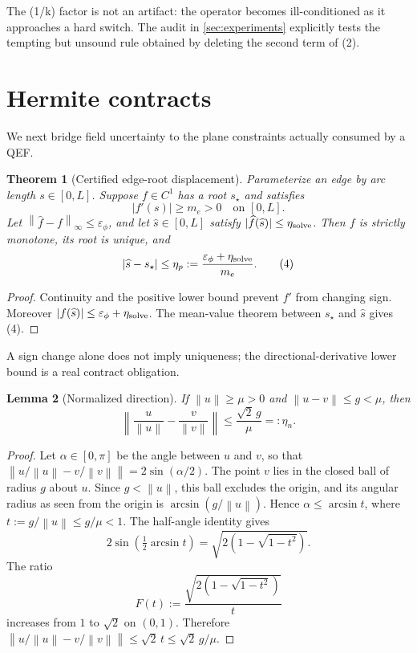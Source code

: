 \documentclass[11pt]{article}
\newtheorem{theorem}{Theorem}
\newtheorem{lemma}[theorem]{Lemma}
\theoremstyle{definition}
\newcommand{\norm}[1]{\left\lVert#1\right\rVert}
\begin{document}
The (1/k) factor is not an artifact: the operator becomes ill-conditioned as
it approaches a hard switch.  The audit in \cref{sec:experiments} explicitly
tests the tempting but unsound rule obtained by deleting the second term of
(2).

\section{Hermite contracts}

We next bridge field uncertainty to the plane constraints actually consumed by
a QEF.

\begin{theorem}[Certified edge-root displacement]
\label{thm:root}
Parameterize an edge by arc length \(s\in[0,L]\).  Suppose \(f\in C^1\) has a
root \(s_\star\) and satisfies
\[
|f'(s)|\ge m_e>0 \quad\text{on }[0,L].
\]
Let \(\norm{\widehat f-f}_\infty\le\varepsilon_\phi\), and let
\(\widehat s\in[0,L]\) satisfy
\(
|\widehat f(\widehat s)|\le\eta_{\rm solve}
\).  Then \(f\) is strictly monotone, its root is unique, and
\[
|\widehat s-s_\star|
\le\eta_p:=\frac{\varepsilon_\phi+\eta_{\rm solve}}{m_e}. \tag{4}
\]
\end{theorem}

\begin{proof}
Continuity and the positive lower bound prevent \(f'\) from changing sign.
Moreover
\(
|f(\widehat s)|\le\varepsilon_\phi+\eta_{\rm solve}
\).  The mean-value theorem between \(s_\star\) and \(\widehat s\) gives (4).
\end{proof}

A sign change alone does not imply uniqueness; the directional-derivative
lower bound is a real contract obligation.

\begin{lemma}[Normalized direction]
\label{lem:normal}
If \(\norm u\ge\mu>0\) and \(\norm{u-v}\le g<\mu\), then
\[
\norm{\frac{u}{\norm u}-\frac{v}{\norm v}}
\le\frac{\sqrt{2}\,g}{\mu}=: \eta_n. \tag{5}
\]
\end{lemma}

\begin{proof}
Let \(\alpha\in[0,\pi]\) be the angle between \(u\) and \(v\), so that
\(
\norm{u/\norm u-v/\norm v}=2\sin(\alpha/2)
\).
The point \(v\) lies in the closed ball of radius \(g\) about \(u\).  Since
\(g<\norm u\), this ball excludes the origin, and its angular radius as seen
from the origin is \(\arcsin(g/\norm u)\).  Hence
\(\alpha\le\arcsin t\), where
\(t:=g/\norm u\le g/\mu<1\).  The half-angle identity gives
\[
2\sin\!\left(\tfrac12\arcsin t\right)
=\sqrt{2\left(1-\sqrt{1-t^2}\right)}.
\]
The ratio
\[
F(t):=\frac{\sqrt{2(1-\sqrt{1-t^2})}}{t}
\]
increases from \(1\) to \(\sqrt{2}\) on \((0,1)\).  Therefore
\(
\norm{u/\norm u-v/\norm v}
\le\sqrt{2}\,t\le\sqrt{2}\,g/\mu
\).
\end{proof}
\end{document}
